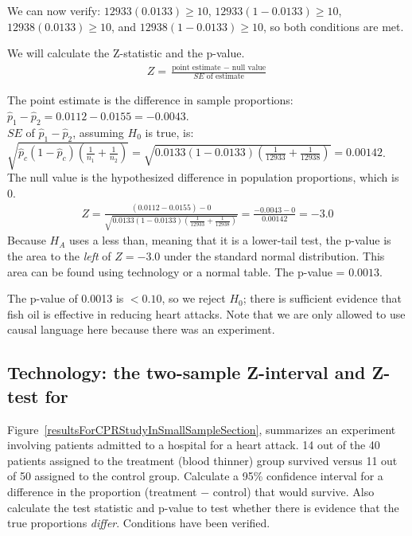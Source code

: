 \begin{examplewrap}
\begin{nexample}
\begin{description}
We can now verify: $12933(0.0133)\geq10$, $12933(1-0.0133)\geq10$, $12938(0.0133)\geq10$, and $12938(1-0.0133)\geq10$,  so both conditions are met. 
\item[ \inferencestep{Calculate} ]  We will calculate the Z-statistic and the p-value.
\begin{align*}
Z = \frac{\text{point estimate } - \text{ null value}}{SE \text{ of estimate}}
\end{align*}

The point estimate is the difference in sample proportions: $\hat{p}_1-\hat{p}_2 = 0.0112 - 0.0155 = -0.0043$. \\

$SE$ of $\hat{p}_1-\hat{p}_2$, assuming $H_0$ is true, is: \\
$\sqrt{\hat{p}_c(1-\hat{p}_c)\left(\frac{1}{n_1} + \frac{1}{n_2} \right)}= \sqrt{0.0133(1-0.0133)\left(\frac{1}{12933} + \frac{1}{12938}\right)}=0.00142$. \\

The null value is the hypothesized difference in population proportions, which is 0. 
\begin{align*}
Z =\frac{(0.0112 - 0.0155) - 0}{\sqrt{0.0133(1-0.0133)\left(\frac{1}{12933} + \frac{1}{12938}\right)}} = \frac{-0.0043 - 0}{0.00142} = -3.0
\end{align*}
Because $H_A$ uses a less than, meaning that it is a lower-tail test, the \mbox{p-value} is the area to the \emph{left} of $Z=-3.0$ under the standard normal distribution.  This area can be found using technology or a normal table.  The p-value = $0.0013$.  
\item[\inferencestep{Conclude}]  The p-value of 0.0013 is $< 0.10$, so we reject $H_0$; there is sufficient evidence that fish oil is effective in reducing heart attacks.  Note that we are only allowed to use causal language here because there was an experiment. 
\end{description}
\end{nexample}
\end{examplewrap}


\D{\newpage}

\subsection[Technology: the two-sample Z-interval and Z-test for $p_1 - p_2$]{Technology: the two-sample Z-interval and Z-test for }
\label{tech2Z}

\noindent Figure~\ref{resultsForCPRStudyInSmallSampleSection}, summarizes an experiment involving patients admitted to a hospital for a heart attack.  14 out of the 40 patients assigned to the treatment (blood thinner) group survived versus 11 out of 50 assigned to the control group. Calculate a 95\% confidence interval for a difference in the proportion (treatment $-$ control) that would survive.  Also calculate the test statistic and p-value to test whether there is evidence that the true proportions \textit{differ}.  Conditions have been verified.\\


